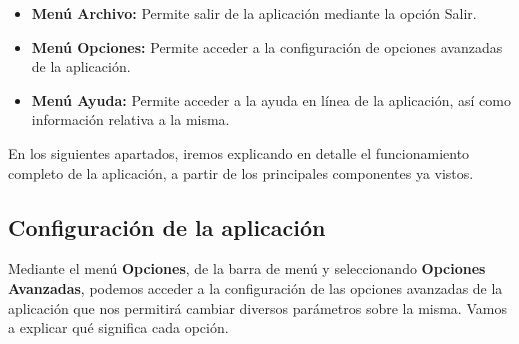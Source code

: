 \begin{itemize}
\item \textbf{Menú Archivo:} Permite salir de la aplicación mediante la opción Salir.
\item \textbf{Menú Opciones:} Permite acceder a la configuración de opciones avanzadas de la aplicación.
\item \textbf{Menú Ayuda:} Permite acceder a la ayuda en línea de la aplicación, así como información relativa a la misma.
\end{itemize}


En los siguientes apartados, iremos explicando en detalle el funcionamiento completo de la aplicación, a partir de los principales componentes ya vistos.

\subsection{Configuración de la aplicación}
Mediante el menú \textbf{Opciones}, de la barra de menú y seleccionando \textbf{Opciones Avanzadas}, podemos acceder a la configuración de las opciones avanzadas de la aplicación que nos permitirá cambiar diversos parámetros sobre la misma. Vamos a explicar qué significa cada opción.


